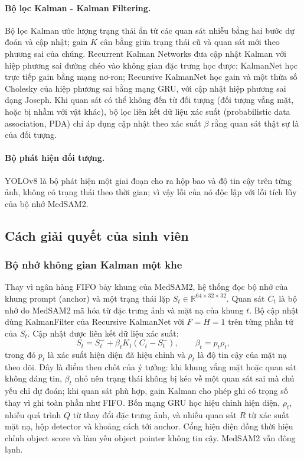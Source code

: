 \documentclass[a4paper,12pt]{report}
\begin{document}
\paragraph{Bộ lọc Kalman - Kalman Filtering.} Bộ lọc Kalman \cite{kalman} ước lượng trạng thái ẩn từ các quan sát nhiễu bằng hai bước dự đoán và cập nhật; gain $K$ cân bằng giữa trạng thái cũ và quan sát mới theo phương sai của chúng. Recurrent Kalman Networks \cite{rkn} đưa cập nhật Kalman với hiệp phương sai đường chéo vào không gian đặc trưng học được; KalmanNet \cite{kalmannet} học trực tiếp gain bằng mạng nơ-ron; Recursive KalmanNet \cite{recursivekalmannet} học gain và một thừa số Cholesky của hiệp phương sai bằng mạng GRU, với cập nhật hiệp phương sai dạng Joseph. Khi quan sát có thể không đến từ đối tượng (đối tượng vắng mặt, hoặc bị nhầm với vật khác), bộ lọc liên kết dữ liệu xác suất (probabilistic data association, PDA) chỉ áp dụng cập nhật theo xác suất $\beta$ rằng quan sát thật sự là của đối tượng.

\paragraph{Bộ phát hiện đối tượng.} YOLOv8 là bộ phát hiện một giai đoạn cho ra hộp bao và độ tin cậy trên từng ảnh, không có trạng thái theo thời gian; vì vậy lỗi của nó độc lập với lỗi tích lũy của bộ nhớ MedSAM2.

\subsection{Cách giải quyết của sinh viên}

\subsubsection{Bộ nhớ không gian Kalman một khe}

Thay vì ngân hàng FIFO bảy khung của MedSAM2, hệ thống đọc bộ nhớ của khung prompt (anchor) và một trạng thái lặp $S_t\in\mathbb{R}^{64\times32\times32}$. Quan sát $C_t$ là bộ nhớ do MedSAM2 mã hóa từ đặc trưng ảnh và mặt nạ của khung $t$. Bộ cập nhật dùng KalmanFilter của Recursive KalmanNet với $F=H=1$ trên từng phần tử của $S_t$. Cập nhật được liên kết dữ liệu xác suất:
\[
S_t=S_t^-+\beta_tK_t(C_t-S_t^-),\qquad \beta_t=p_t\rho_t,
\]
trong đó $p_t$ là xác suất hiện diện đã hiệu chỉnh và $\rho_t$ là độ tin cậy của mặt nạ theo dõi. Đây là điểm then chốt của ý tưởng: khi khung vắng mặt hoặc quan sát không đáng tin, $\beta_t$ nhỏ nên trạng thái không bị kéo về một quan sát sai mà chủ yếu chỉ dự đoán; khi quan sát phù hợp, gain Kalman cho phép ghi có trọng số thay vì ghi toàn phần như FIFO. Bốn mạng GRU học hiệu chỉnh hiện diện, $\rho_t$, nhiễu quá trình $Q$ từ thay đổi đặc trưng ảnh, và nhiễu quan sát $R$ từ xác suất mặt nạ, hộp detector và khoảng cách tới anchor. Cổng hiện diện đồng thời hiệu chỉnh object score và làm yếu object pointer không tin cậy. MedSAM2 vẫn đông lạnh.
\end{document}
